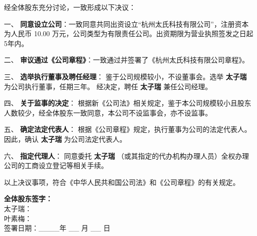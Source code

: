 \documentclass[a4paper, 12pt]{ctexart}
\begin{document}
\vspace{0.5cm}
\noindent 经全体股东充分讨论，一致形成以下决议：

\vspace{0.3cm}
\noindent 一、 \textbf{同意设立公司}：一致同意共同出资设立“杭州太氏科技有限公司”，注册资本为人民币 10.00 万元，公司类型为有限责任公司。出资期限为营业执照签发之日起5年内。

\vspace{0.3cm}
\noindent 二、 \textbf{审议通过《公司章程》}：一致通过并签署了《杭州太氏科技有限公司章程》。

\vspace{0.3cm}
\noindent 三、 \textbf{选举执行董事及聘任经理}：
鉴于公司规模较小，不设董事会。选举 \textbf{太子瑞} 为公司执行董事，任期三年。
经决定，聘任 \textbf{太子瑞} 兼任公司经理。

\vspace{0.3cm}
\noindent 四、 \textbf{关于监事的决定}：
根据新《公司法》相关规定，鉴于本公司规模较小且股东人数较少，经全体股东一致同意，本公司不设监事会，亦不设监事。

\vspace{0.3cm}
\noindent 五、 \textbf{确定法定代表人}：
根据《公司章程》规定，执行董事为公司的法定代表人。因此，确认 \textbf{太子瑞} 为公司法定代表人。

\vspace{0.3cm}
\noindent 六、 \textbf{指定代理人}：
同意委托 \textbf{太子瑞} （或其指定的代办机构办理人员）全权办理公司的工商设立登记等相关手续。

\vspace{1cm}
\noindent 以上决议事项，符合《中华人民共和国公司法》和《公司章程》的有关规定。

\vspace{2cm}
\begin{flushright}
\textbf{全体股东签字：} \\
\vspace{1cm}
太子瑞：\underline{\hspace{4cm}} \\
\vspace{1.5cm}
叶素梅：\underline{\hspace{4cm}} \\
\vspace{1.5cm}
签署日期：\_\_\_\_年 \_\_ 月 \_\_ 日
\end{flushright}
\end{document}
